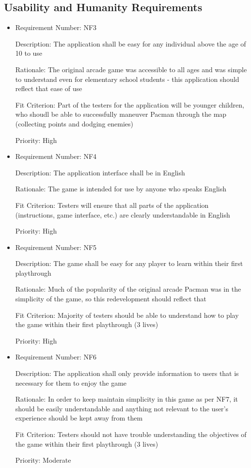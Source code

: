 \documentclass[12pt, titlepage]{article}
\begin{document}
\subsection{Usability and Humanity Requirements}
\begin{itemize}
	\item
	Requirement Number: NF3

	Description: The application shall be easy for any individual above the age of 10 to use

	Rationale: The original arcade game was accessible to all ages and was simple to understand even for elementary school students - this application should reflect that ease of use

	Fit Criterion: Part of the testers for the application will be younger children, who shoudl be able to successfully maneuver Pacman through the map (collecting points and dodging enemies)

	Priority: High

	\item
	Requirement Number: NF4

	Description: The application interface shall be in English

	Rationale: The game is intended for use by anyone who speaks English

	Fit Criterion: Testers will ensure that all parts of the application (instructions, game interface, etc.) are clearly understandable in English

	Priority: High

	\item
	Requirement Number: NF5

	Description: The game shall be easy for any player to learn within their first playthrough

	Rationale: Much of the popularity of the original arcade Pacman was in the simplicity of the game, so this redevelopment should reflect that

	Fit Criterion: Majority of testers should be able to understand how to play the game within their first playthrough (3 lives)

	Priority: High

	\item
	Requirement Number: NF6

	Description: The application shall only provide information to users that is necessary for them to enjoy the game

	Rationale: In order to keep maintain simplicity in this game as per NF7, it should be easily understandable and anything not relevant to the user's experience should be kept away from them

	Fit Criterion: Testers should not have trouble understanding the objectives of the game within their first playthrough (3 lives)

	Priority: Moderate
\end{itemize}
\end{document}
